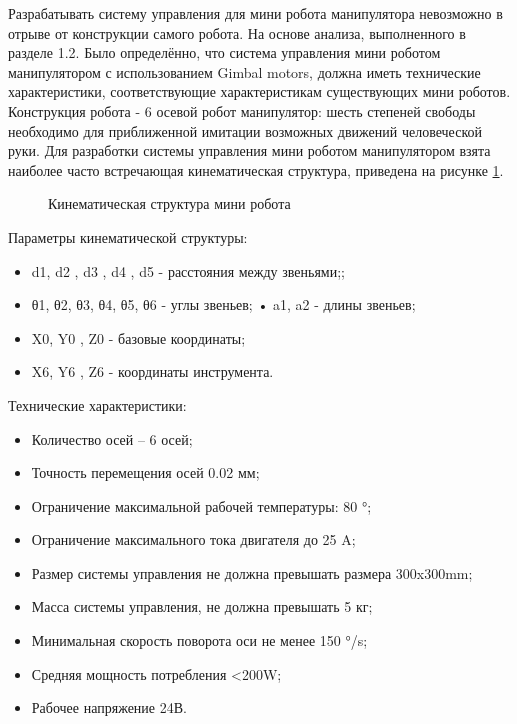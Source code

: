 Разрабатывать систему управления для мини робота манипулятора невозможно в отрыве от конструкции самого робота. На основе анализа, выполненного в разделе 1.2. Было определённо, что система управления мини роботом манипулятором с использованием Gimbal motors, должна иметь технические характеристики, соответствующие характеристикам существующих мини роботов. Конструкция робота - 6 осевой робот манипулятор: шесть степеней свободы необходимо для приближенной имитации возможных движений человеческой руки. Для разработки системы управления мини роботом манипулятором взята наиболее часто встречающая кинематическая структура, приведена на рисунке \ref{Kin}.


\begin{figure}[H]
	\centering
	
	\caption{Кинематическая структура мини робота}
	\label{Kin}
\end{figure}

Параметры кинематической структуры:

\begin{itemize}
	\item d1, d2 , d3 , d4 , d5 - расстояния между звеньями;;
	\item θ1, θ2, θ3, θ4, θ5, θ6 - углы звеньев;
	• a1, a2 - длины звеньев;
	\item X0, Y0 , Z0 - базовые координаты;
	\item X6, Y6 , Z6 - координаты инструмента.
\end{itemize}

Технические характеристики:
\begin{itemize}
	\item Количество осей – 6 осей;
	\item Точность перемещения осей 0.02 мм;
	\item Ограничение максимальной рабочей температуры: 80 °;
	\item Ограничение максимального тока двигателя до 25 A;
	\item Размер системы управления не должна превышать размера 300x300mm;
	\item Масса системы управления, не должна превышать 5 кг;
	\item Минимальная скорость поворота оси не менее 150 °/s;
	\item Средняя мощность потребления <200W;
	\item Рабочее напряжение 24В.
\end{itemize}

